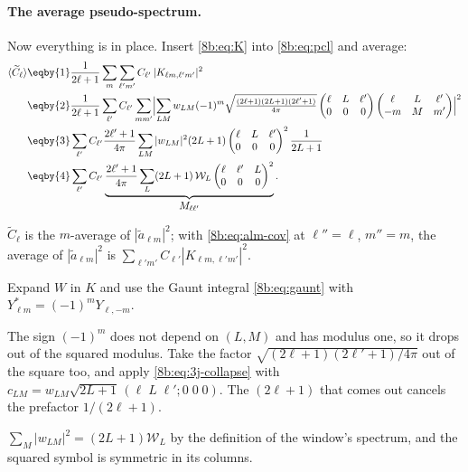 \paragraph{The average pseudo-spectrum.}
Now everything is in place. Insert \eqref{8b:eq:K} into \eqref{8b:eq:pcl} and average:
\begin{align}
  \langle\widetilde C_\ell\rangle
  &\eqby{1}\frac1{2\ell+1}\sum_m\sum_{\ell'm'}C_{\ell'}\,|K_{\ell m,\ell'm'}|^2 \nonumber\\
  &\eqby{2}\frac1{2\ell+1}\sum_{\ell'}C_{\ell'}\sum_{mm'}\Bigl|\sum_{LM}w_{LM}(-1)^m
     \sqrt{\tfrac{(2\ell+1)(2L+1)(2\ell'+1)}{4\pi}}
     \begin{pmatrix}\ell&L&\ell'\\0&0&0\end{pmatrix}
     \begin{pmatrix}\ell&L&\ell'\\-m&M&m'\end{pmatrix}\Bigr|^2 \nonumber\\
  &\eqby{3}\sum_{\ell'}C_{\ell'}\frac{2\ell'+1}{4\pi}\sum_{LM}|w_{LM}|^2(2L+1)
     \begin{pmatrix}\ell&L&\ell'\\0&0&0\end{pmatrix}^2\frac1{2L+1} \nonumber\\
  &\eqby{4}\sum_{\ell'}C_{\ell'}\underbrace{\frac{2\ell'+1}{4\pi}\sum_L(2L+1)\,\mathcal W_L
     \begin{pmatrix}\ell&\ell'&L\\0&0&0\end{pmatrix}^2}_{\displaystyle M_{\ell\ell'}} .
  \label{8b:eq:M}
\end{align}
\begin{explain}
  \item $\widetilde C_\ell$ is the $m$-average of $|\tilde a_{\ell m}|^2$; with \eqref{8b:eq:alm-cov} at $\ell''=\ell$,
        $m''=m$, the average of $|\tilde a_{\ell m}|^2$ is $\sum_{\ell'm'}C_{\ell'}|K_{\ell m,\ell'm'}|^2$.
  \item Expand $W$ in $K$ and use the Gaunt integral \eqref{8b:eq:gaunt} with $Y^*_{\ell m}=(-1)^mY_{\ell,-m}$.
  \item The sign $(-1)^m$ does not depend on $(L,M)$ and has modulus one, so it drops out of the squared
        modulus. Take the factor $\sqrt{(2\ell+1)(2\ell'+1)/4\pi}$ out of the square too, and apply
        \eqref{8b:eq:3j-collapse} with $c_{LM}=w_{LM}\sqrt{2L+1}\,(\ell\;L\;\ell';0\;0\;0)$. The $(2\ell+1)$ that
        comes out cancels the prefactor $1/(2\ell+1)$.
  \item $\sum_M|w_{LM}|^2=(2L+1)\mathcal W_L$ by the definition of the window's spectrum, and the
        squared symbol is symmetric in its columns.
\end{explain}
